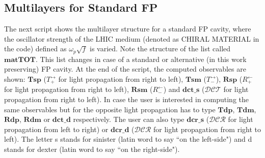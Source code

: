 \documentclass[showpacs,aps,prl,onecolumn,superscriptaddress]{revtex4-1}
\begin{document}
\subsection{Multilayers for Standard FP}
The next script shows the multilayer structure for a standard FP cavity, where the oscillator strength of the LHIC medium (denoted as CHIRAL MATERIAL in the code) defined as $\omega_{p}\sqrt{f}$ is varied. Note the structure of the list called $\mathbf{matTOT}$. This list changes in case of a standard or alternative (in this work preserving) FP cavity. At the end of the script, the computed observables are shown: $\mathbf{Tsp}$ ($T^{\rightarrow}_{+}$ for light propagation from right to left), $\mathbf{Tsm}$ ($T^{\rightarrow}_{-}$), $\mathbf{Rsp}$ ($R^{\leftarrow}_{+}$ for light propagation from right to left), $\mathbf{Rsm}$ ($R^{\leftarrow}_{-}$) and $\mathbf{dct\_s}$ ($\mathcal{DCT}$ for light propagation from right to left). In case the user is interested in computing the same observables but for the opposite light propagation has to type $\mathbf{Tdp}$, $\mathbf{Tdm}$, $\mathbf{Rdp}$, $\mathbf{Rdm}$ or $\mathbf{dct\_d}$ respectively. The user can also type $\mathbf{dcr\_s}$ ($\mathcal{DCR}$ for light propagation from left to right) or $\mathbf{dcr\_d}$ ($\mathcal{DCR}$ for light propagation from right to left). The letter s stands for sinister (latin word to say ``on the left-side") and d stands for dexter (latin word to say ``on the right-side").
\end{document}
